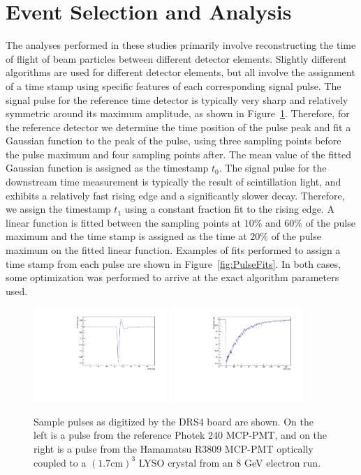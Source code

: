 \documentclass[12pt]{article}
\begin{document}
\section{Event Selection and Analysis}

The analyses performed in these studies primarily involve
reconstructing the time of flight of beam particles
between different detector elements. Slightly different
algorithms are used for different detector elements,
but all involve the assignment of a time stamp using 
specific features of each corresponding signal pulse.
The signal pulse for the reference time detector
is typically very sharp and relatively symmetric 
around its maximum amplitude, as shown in 
Figure~\ref{fig:PulseShapes}. Therefore, for the reference 
detector we determine the time position of the pulse
peak and fit a Gaussian function to the peak
of the pulse, using three sampling points before the 
pulse maximum and four sampling points after. The
mean value of the fitted Gaussian function is
assigned as the timestamp $t_{0}$. The signal pulse
for the downstream time measurement is typically
the result of scintillation light, and exhibits a 
relatively fast rising edge and a significantly slower
decay. Therefore, we assign the timestamp $t_{1}$ 
using a constant fraction fit to the rising edge.
A linear function is fitted between the sampling
points at $10\%$ and $60\%$ of the pulse maximum
and the time stamp is assigned as the time 
at $20\%$ of the pulse maximum on the fitted
linear function. Examples of fits performed to assign a 
time stamp from each pulse are shown in Figure~\ref{fig:PulseFits}.
In both cases, some optimization was performed 
to arrive at the exact algorithm parameters used.

\begin{figure}[h] \centering
\includegraphics[width=0.45\textwidth]{figs/RefPulse} 
\includegraphics[width=0.45\textwidth]{figs/run064_event506} 
\caption{Sample pulses as digitized by the DRS4 board are shown. 
On the left is a  pulse from the reference Photek 240 MCP-PMT, 
and on the right is a pulse from the Hamamatsu R3809 MCP-PMT
optically coupled to a $(1.7\mathrm{ cm})^3$ LYSO crystal 
from an 8 GeV electron run.} 
\label{fig:PulseShapes}
\end{figure}
\end{document}
